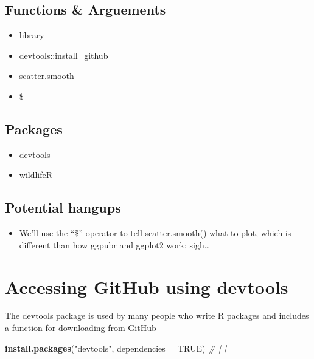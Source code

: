 \documentclass[]{book}
\newenvironment{Shaded}{\begin{snugshade}}{\end{snugshade}}
\newcommand{\KeywordTok}[1]{\textcolor[rgb]{0.13,0.29,0.53}{\textbf{#1}}}
\newcommand{\DataTypeTok}[1]{\textcolor[rgb]{0.13,0.29,0.53}{#1}}
\newcommand{\StringTok}[1]{\textcolor[rgb]{0.31,0.60,0.02}{#1}}
\newcommand{\CommentTok}[1]{\textcolor[rgb]{0.56,0.35,0.01}{\textit{#1}}}
\newcommand{\OtherTok}[1]{\textcolor[rgb]{0.56,0.35,0.01}{#1}}
\newcommand{\NormalTok}[1]{#1}
\providecommand{\tightlist}{%
  \setlength{\itemsep}{0pt}\setlength{\parskip}{0pt}}
\theoremstyle{definition}
\theoremstyle{definition}
\theoremstyle{definition}
\theoremstyle{remark}
\begin{document}
\subsection{Functions \& Arguements}\label{functions-arguements-1}

\begin{itemize}
\tightlist
\item
  library
\item
  devtools::install\_github
\item
  scatter.smooth
\item
  \$
\end{itemize}

\subsection{Packages}\label{packages-2}

\begin{itemize}
\tightlist
\item
  devtools
\item
  wildlifeR
\end{itemize}

\subsection{Potential hangups}\label{potential-hangups-1}

\begin{itemize}
\tightlist
\item
  We'll use the ``\$'' operator to tell scatter.smooth() what to plot,
  which is different than how ggpubr and ggplot2 work; sigh\ldots{}
\end{itemize}

\section{\texorpdfstring{\protect\hyperlink{section-3}{} Accessing
GitHub using
devtools}{ Accessing GitHub using devtools}}\label{accessing-github-using-devtools}

The devtools package is used by many people who write R packages and
includes a function for downloading from GitHub

\begin{Shaded}
\begin{Highlighting}[]
\KeywordTok{install.packages}\NormalTok{(}\StringTok{"devtools"}\NormalTok{, }\DataTypeTok{dependencies =} \OtherTok{TRUE}\NormalTok{) }\CommentTok{# [ ]}
\end{Highlighting}
\end{Shaded}
\end{document}
